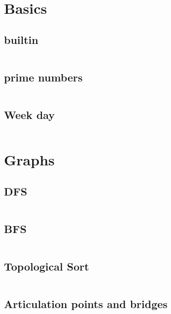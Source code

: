 \documentclass[a4paper, 10pt, twocolumn, landscape]{article}
\begin{document}
  \pagestyle{fancy}

  \setlength{\columnseprule}{1pt}
  \large

  \tableofcontents

  \section{Basics}

  \subsection{builtin}
  \inputminted{cpp}{misc/builtin.cpp}
  \subsection{prime numbers}
  \inputminted{text}{misc/prime-numbers.txt}
  \subsection{Week day}
  \inputminted{cpp}{misc/week-day.cpp}

  \section{Graphs}
  \subsection{DFS}
  \inputminted{cpp}{graphs/dfs.cpp}
  \subsection{BFS}
  \inputminted{cpp}{graphs/bfs.cpp}
  \subsection{Topological Sort}
  \inputminted{cpp}{graphs/kahn.cpp}
  \subsection{Articulation points and bridges}
  \inputminted{cpp}{graphs/articulation.cpp}
\end{document}
